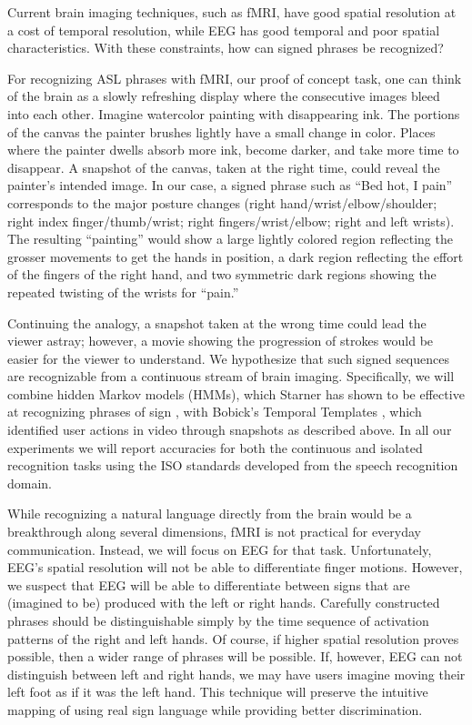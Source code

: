 \documentclass{proposal}
\begin{document}
Current brain imaging techniques, such as fMRI, have good spatial resolution at a cost of temporal resolution, while EEG has good temporal and poor spatial characteristics.  With these constraints, how can signed phrases be recognized?  

For recognizing ASL phrases with fMRI, our proof of concept task, one can think of the brain as a slowly refreshing display where the consecutive images bleed into each other.  Imagine watercolor painting with disappearing ink.  The portions of the canvas the painter brushes lightly have a small change in color. Places where the painter dwells absorb more ink, become darker, and take more time to disappear.  A snapshot of the canvas, taken at the right time, could reveal the painter's intended image. In our case, a signed phrase such as ``Bed hot, I pain'' corresponds to the major posture changes (right hand/wrist/elbow/shoulder; right index finger/thumb/wrist; right fingers/wrist/elbow; right and left wrists).  The resulting ``painting'' would show a large lightly colored region reflecting the grosser movements to get the hands in position, a dark region reflecting the effort of the fingers of the right hand, and two symmetric dark regions showing the repeated twisting of the wrists for ``pain.''

Continuing the analogy, a snapshot taken at the wrong time could lead the viewer astray; however, a movie showing the progression of strokes would be easier for the viewer to understand.  We hypothesize that such signed sequences are recognizable from a continuous stream of brain imaging.  Specifically, we will combine hidden Markov models (HMMs), which Starner has shown to be effective at recognizing phrases of sign \cite{starner1998rta}, with Bobick's Temporal Templates \cite{bobick2001rhm}, which identified user actions in video through snapshots as described above. In all our experiments we will report accuracies for both the continuous and isolated recognition tasks using the ISO standards developed from the speech recognition domain.

While recognizing a natural language directly from the brain would be a breakthrough along several dimensions, fMRI is not practical for everyday communication.  Instead, we will focus on EEG for that task.  Unfortunately, EEG's spatial resolution will not be able to differentiate finger motions.  However, we suspect that EEG will be able to differentiate between signs that are (imagined to be) produced with the left or right hands.  Carefully constructed phrases should be distinguishable simply by the time sequence of activation patterns of the right and left hands.  Of course, if higher spatial resolution proves possible, then a wider range of phrases will be possible.  If, however, EEG can not distinguish between left and right hands, we may have users imagine moving their left foot as if it was the left hand.  This technique will preserve the intuitive mapping of using real sign language while providing better discrimination.  
\end{document}
